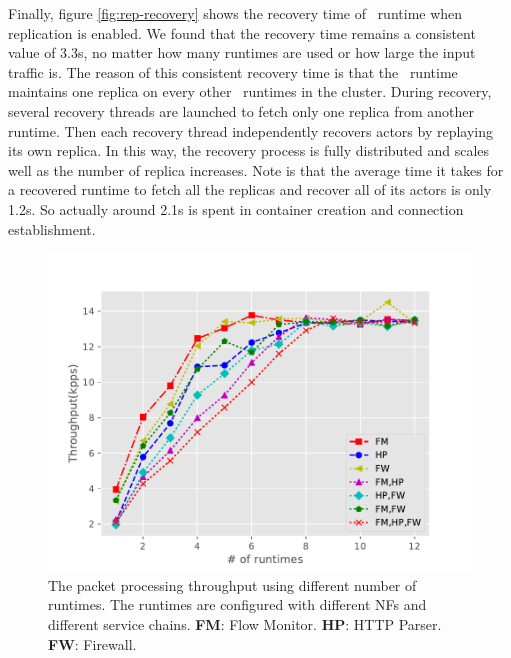 Finally, figure \ref{fig:rep-recovery} shows the recovery time of \nfactor~runtime when replication is enabled. We found that the recovery time remains a consistent value of 3.3s, no matter how many runtimes are used or how large the input traffic is. The reason of this consistent recovery time is that the \nfactor~runtime maintains one replica on every other \nfactor~runtimes in the cluster. During recovery, several recovery threads are launched to fetch only one replica from another runtime. Then each recovery thread independently recovers actors by replaying its own replica. In this way, the recovery process is fully distributed and scales well as the number of replica increases. Note is that the average time it takes for a recovered runtime to fetch all the replicas and recover all of its actors is only 1.2s. So actually around 2.1s is spent in container creation and connection establishment.

\begin{figure}[!h]
	\centering
	\includegraphics[width=\columnwidth]{figure/NormalCaseTP.pdf}
	\caption{The packet processing throughput using different number of runtimes. The runtimes are configured with different NFs and different service chains.
  \textbf{FM}: Flow Monitor. \textbf{HP}: HTTP Parser. \textbf{FW}: Firewall.}
\label{fig:normal-case-eval}
\end{figure}

